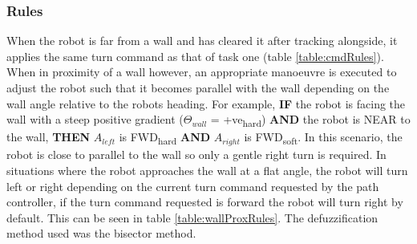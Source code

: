 \documentclass[10pt]{article}
\begin{document}
\subsubsection{Rules}
When the robot is far from a wall and has cleared it after tracking alongside, it applies the same turn command as that of task one (table \ref{table:cmdRules}).
When in proximity of a wall however, an appropriate manoeuvre is executed to adjust the robot such that it becomes parallel with the wall depending on the wall angle relative to the robots heading. 
For example, \textbf{IF} the robot is facing the wall with a steep positive gradient ($\Theta_{wall}$ = +ve\textsubscript{hard}) \textbf{AND} the robot is NEAR to the wall, \textbf{THEN} $A_{left}$ is FWD\textsubscript{hard} \textbf{AND} $A_{right}$ is FWD\textsubscript{soft}.
In this scenario, the robot is close to parallel to the wall so only a gentle right turn is required.
In situations where the robot approaches the wall at a flat angle, the robot will turn left or right depending on the current turn command requested by the path controller, if the turn command requested is forward the robot will turn right by default.
This can be seen in table \ref{table:wallProxRules}. 
The defuzzification method used was the bisector method.
\end{document}
